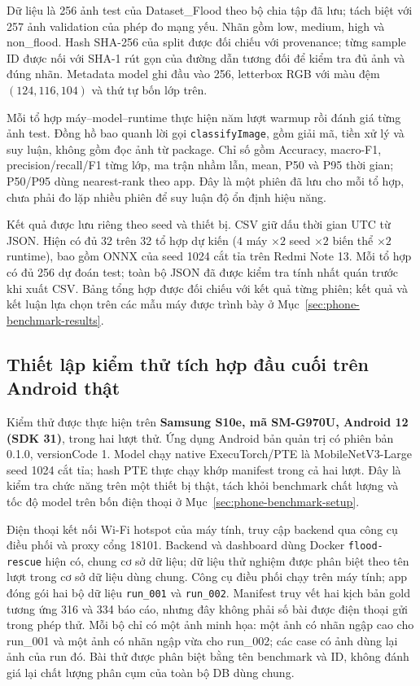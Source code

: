 Dữ liệu là 256 ảnh test của Dataset\_Flood theo bộ chia tập đã lưu; tách biệt với 257 ảnh validation của phép đo mạng yếu. Nhãn gồm low, medium, high và non\_flood. Hash SHA-256 của split được đối chiếu với provenance; từng sample ID được nối với SHA-1 rút gọn của đường dẫn tương đối để kiểm tra đủ ảnh và đúng nhãn. Metadata model ghi đầu vào 256, letterbox RGB với màu đệm $(124,116,104)$ và thứ tự bốn lớp trên.

Mỗi tổ hợp máy--model--runtime thực hiện năm lượt warmup rồi đánh giá từng ảnh test. Đồng hồ bao quanh lời gọi \texttt{classifyImage}, gồm giải mã, tiền xử lý và suy luận, không gồm đọc ảnh từ package. Chỉ số gồm Accuracy, macro-F1, precision/recall/F1 từng lớp, ma trận nhầm lẫn, mean, P50 và P95 thời gian; P50/P95 dùng nearest-rank theo app. Đây là một phiên đã lưu cho mỗi tổ hợp, chưa phải đo lặp nhiều phiên để suy luận độ ổn định hiệu năng.

Kết quả được lưu riêng theo seed và thiết bị. CSV giữ dấu thời gian UTC từ JSON. Hiện có đủ 32 trên 32 tổ hợp dự kiến ($4$ máy $\times 2$ seed $\times 2$ biến thể $\times 2$ runtime), bao gồm ONNX của seed 1024 cắt tỉa trên Redmi Note 13. Mỗi tổ hợp có đủ 256 dự đoán test; toàn bộ JSON đã được kiểm tra tính nhất quán trước khi xuất CSV. Bảng tổng hợp được đối chiếu với kết quả từng phiên; kết quả và kết luận lựa chọn trên các mẫu máy được trình bày ở Mục~\ref{sec:phone-benchmark-results}.

\subsection{Thiết lập kiểm thử tích hợp đầu cuối trên Android thật}\label{sec:mobile-system-setup}
Kiểm thử được thực hiện trên \textbf{Samsung S10e, mã SM-G970U, Android 12 (SDK 31)}, trong hai lượt thử. Ứng dụng Android bản quản trị có phiên bản 0.1.0, versionCode 1. Model chạy native ExecuTorch/PTE là MobileNetV3-Large seed 1024 cắt tỉa; hash PTE thực chạy khớp manifest trong cả hai lượt. Đây là kiểm tra chức năng trên một thiết bị thật, tách khỏi benchmark chất lượng và tốc độ model trên bốn điện thoại ở Mục~\ref{sec:phone-benchmark-setup}.

Điện thoại kết nối Wi-Fi hotspot của máy tính, truy cập backend qua công cụ điều phối và proxy cổng 18101. Backend và dashboard dùng Docker \texttt{flood-rescue} hiện có, chung cơ sở dữ liệu; dữ liệu thử nghiệm được phân biệt theo tên lượt trong cơ sở dữ liệu dùng chung. Công cụ điều phối chạy trên máy tính; app đóng gói hai bộ dữ liệu \texttt{run\_001} và \texttt{run\_002}. Manifest truy vết hai kịch bản gold tương ứng 316 và 334 báo cáo, nhưng đây không phải số bài được điện thoại gửi trong phép thử. Mỗi bộ chỉ có một ảnh minh họa: một ảnh có nhãn ngập cao cho run\_001 và một ảnh có nhãn ngập vừa cho run\_002; các case có ảnh dùng lại ảnh của run đó. Bài thử được phân biệt bằng tên benchmark và ID, không đánh giá lại chất lượng phân cụm của toàn bộ DB dùng chung.

